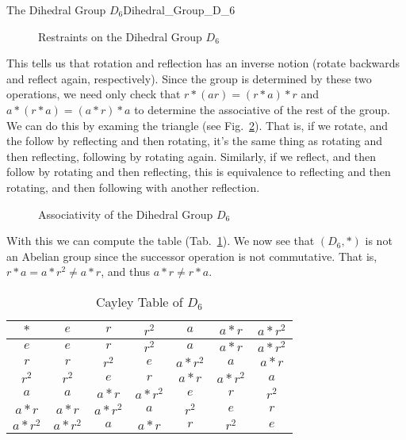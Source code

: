 \begin{lexample}{The Dihedral Group $D_{6}$}{Dihedral_Group_D_6}
\begin{figure}[H]
            \resizebox{\textwidth}{!}{%
                
            }
            \caption{Restraints on the Dihedral Group $D_{6}$}
            \label{fig:Restraints_on_D_6}
        \end{figure}
        This tells us that rotation and reflection has an inverse notion
        (rotate backwards and reflect again, respectively). Since the group is
        determined by these two operations, we need only check that
        $r*(ar)=(r*a)*r$ and $a*(r*a)=(a*r)*a$ to determine the associative of
        the rest of the group. We can do this by examing the triangle
        (see Fig.~\ref{fig:Assoc_of_Dihedral_Group_D6}). That is, if we
        rotate, and the follow by reflecting and then rotating, it's the same
        thing as rotating and then reflecting, following by rotating again.
        Similarly, if we reflect, and then follow by rotating and then
        reflecting, this is equivalence to reflecting and then rotating, and
        then following with another reflection.
        \begin{figure}[H]
            \centering
            \captionsetup{type=figure}
            \resizebox{\textwidth}{!}{%
                
            }
            \caption{Associativity of the Dihedral Group $D_{6}$}
            \label{fig:Assoc_of_Dihedral_Group_D6}
        \end{figure}
        With this we can compute the table (Tab.~\ref{tab:Cayley_Table_D_6}).
        We now see that $(D_{6},*)$ is not an Abelian group since the successor
        operation is not commutative. That is, $r*a=a*r^{2}\ne{a}*r$, and thus
        $a*r\ne{r}*a$.
    \end{lexample}
    \begin{table}[H]
        \centering
        \captionsetup{type=table}
        \begin{tabular}{c|cccccc}
            $*$&$e$&$r$&$r^{2}$&$a$&$a*r$&$a*r^{2}$\\
            \hline
            $e$&$e$&$r$&$r^{2}$&$a$&$a*r$&$a*r^{2}$\\
            $r$&$r$&$r^{2}$&$e$&$a*r^{2}$&$a$&$a*r$\\
            $r^{2}$&$r^{2}$&$e$&$r$&$a*r$&$a*r^{2}$&$a$\\
            $a$&$a$&$a*r$&$a*r^{2}$&$e$&$r$&$r^{2}$\\
            $a*r$&$a*r$&$a*r^{2}$&$a$&$r^{2}$&$e$&$r$\\
            $a*r^{2}$&$a*r^{2}$&$a$&$a*r$&$r$&$r^{2}$&$e$
        \end{tabular}
        \caption{Cayley Table of $D_{6}$}
        \label{tab:Cayley_Table_D_6}
    \end{table}
